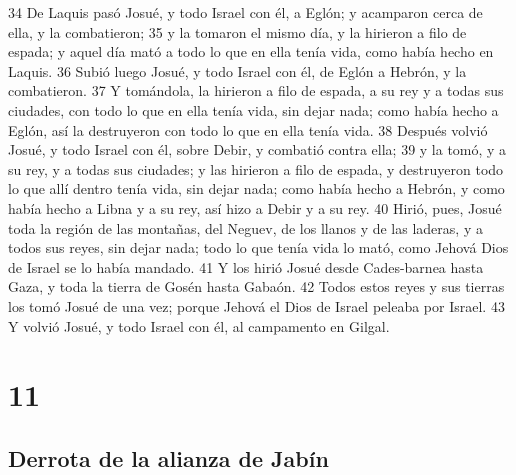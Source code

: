 34 De Laquis pasó Josué, y todo Israel con él, a Eglón; y acamparon cerca de ella, y la combatieron;
35 y la tomaron el mismo día, y la hirieron a filo de espada; y aquel día mató a todo lo que en ella tenía vida, como había hecho en Laquis.
36 Subió luego Josué, y todo Israel con él, de Eglón a Hebrón, y la combatieron.
37 Y tomándola, la hirieron a filo de espada, a su rey y a todas sus ciudades, con todo lo que en ella tenía vida, sin dejar nada; como había hecho a Eglón, así la destruyeron con todo lo que en ella tenía vida.
38 Después volvió Josué, y todo Israel con él, sobre Debir, y combatió contra ella;
39 y la tomó, y a su rey, y a todas sus ciudades; y las hirieron a filo de espada, y destruyeron todo lo que allí dentro tenía vida, sin dejar nada; como había hecho a Hebrón, y como había hecho a Libna y a su rey, así hizo a Debir y a su rey.
40 Hirió, pues, Josué toda la región de las montañas, del Neguev, de los llanos y de las laderas, y a todos sus reyes, sin dejar nada; todo lo que tenía vida lo mató, como Jehová Dios de Israel se lo había mandado.
41 Y los hirió Josué desde Cades-barnea hasta Gaza, y toda la tierra de Gosén hasta Gabaón.
42 Todos estos reyes y sus tierras los tomó Josué de una vez; porque Jehová el Dios de Israel peleaba por Israel.
43 Y volvió Josué, y todo Israel con él, al campamento en Gilgal.

\chapter{11}

\section*{Derrota de la alianza de Jabín}


